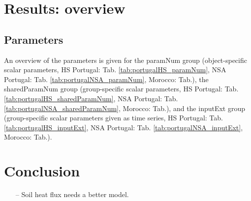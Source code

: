 \documentclass{scrreprt}
\begin{document}

\chapter{Results: overview} \label{ch:results}

\section{Parameters} \label{sec:results_par}

An overview of the parameters is given for the \textsf{paramNum} group (object-specific scalar parameters, HS Portugal: Tab. \ref{tab:portugalHS_paramNum}, NSA Portugal: Tab. \ref{tab:portugalNSA_paramNum}, Morocco: Tab.), the \textsf{sharedParamNum} group (group-specific scalar parameters, HS Portugal: Tab. \ref{tab:portugalHS_sharedParamNum}, NSA Portugal: Tab. \ref{tab:portugalNSA_sharedParamNum}, Morocco: Tab.), and the \textsf{inputExt} group (group-specific scalar parameters given as time series, HS Portugal: Tab. \ref{tab:portugalHS_inputExt}, NSA Portugal: Tab. \ref{tab:portugalNSA_inputExt}, Morocco: Tab.).














\chapter{Conclusion} \label{ch:conclusion}

\begin{itemize}
  \item[--] Soil heat flux needs a better model.
\end{itemize}




\end{document}
